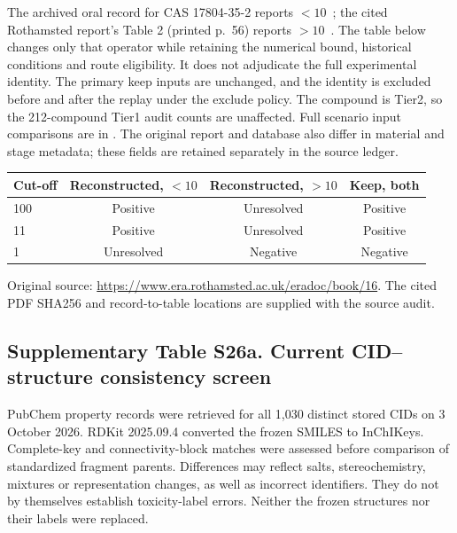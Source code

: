The archived oral record for CAS 17804-35-2 reports $<10$~\ugbee;
the cited Rothamsted report's Table 2 (printed p.~56) reports $>10$~\ugbee.
The table below changes only that operator while retaining the numerical bound,
historical conditions and route eligibility. It does not adjudicate the full
experimental identity. The primary keep inputs are unchanged, and the identity
is excluded before and after the replay under the exclude policy. The compound
is Tier2, so the 212-compound Tier1 audit counts are unaffected. Full scenario
input comparisons are in .
The original report and database also differ in material and stage metadata;
these fields are retained separately in the source ledger.

\begin{center}
\small
\begin{tabular}{lccc}
\toprule
Cut-off & Reconstructed, $<10$ & Reconstructed, $>10$ & Keep, both \\
\midrule
100 & Positive & Unresolved & Positive \\
11 & Positive & Unresolved & Positive \\
1 & Unresolved & Negative & Negative \\
\bottomrule
\end{tabular}
\end{center}

Original source: \url{https://www.era.rothamsted.ac.uk/eradoc/book/16}. The cited PDF SHA256 and record-to-table locations are supplied with the source audit.


\subsection*{Supplementary Table S26a. Current CID--structure consistency screen}

PubChem property records were retrieved for all 1,030 distinct stored
CIDs on 3 October 2026. RDKit 2025.09.4 converted the frozen SMILES to InChIKeys.
Complete-key and connectivity-block matches were assessed before comparison of
standardized fragment parents. Differences may reflect salts, stereochemistry,
mixtures or representation changes, as well as incorrect identifiers. They do
not by themselves establish toxicity-label errors. Neither the frozen structures
nor their labels were replaced.

